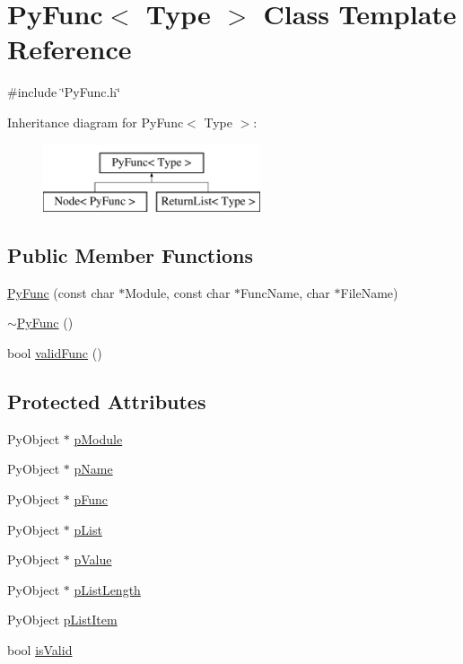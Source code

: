 \hypertarget{classPyFunc}{\section{Py\-Func$<$ Type $>$ Class Template Reference}
\label{classPyFunc}
}


{\ttfamily \#include \char`\"{}Py\-Func.\-h\char`\"{}}

Inheritance diagram for Py\-Func$<$ Type $>$\-:\begin{figure}[H]
\begin{center}
\leavevmode
\includegraphics[height=2.000000cm]{classPyFunc}
\end{center}
\end{figure}
\subsection*{Public Member Functions}
\begin{DoxyCompactItemize}
\item 
\hyperlink{classPyFunc_abdf959abaa390e591d6831631a63b847}{Py\-Func} (const char $\ast$Module, const char $\ast$Func\-Name, char $\ast$File\-Name)
\item 
\hyperlink{classPyFunc_a5813fdcef05c12cb8cc6049386ca4509}{$\sim$\-Py\-Func} ()
\item 
bool \hyperlink{classPyFunc_a9765fda4c500e4225a2d5a766fd4d13b}{valid\-Func} ()
\end{DoxyCompactItemize}
\subsection*{Protected Attributes}
\begin{DoxyCompactItemize}
\item 
Py\-Object $\ast$ \hyperlink{classPyFunc_aa87d68b9046b473e3cfeb4a0e08dccf0}{p\-Module}
\item 
Py\-Object $\ast$ \hyperlink{classPyFunc_aee7f0c1f281e63e0d26ff71b9868c086}{p\-Name}
\item 
Py\-Object $\ast$ \hyperlink{classPyFunc_a941eb18b7d22632c55b41652d79b0481}{p\-Func}
\item 
Py\-Object $\ast$ \hyperlink{classPyFunc_af3d520a4b2580b0ac96ad5ee9f745335}{p\-List}
\item 
Py\-Object $\ast$ \hyperlink{classPyFunc_a3c63064658876c190224c4adc5f5dc07}{p\-Value}
\item 
Py\-Object $\ast$ \hyperlink{classPyFunc_a9794285af7ee57f561e56685b374ff63}{p\-List\-Length}
\item 
Py\-Object \hyperlink{classPyFunc_afcc6a33961a461a500f5ea5b9d280e3e}{p\-List\-Item}
\item 
bool \hyperlink{classPyFunc_a6b9334f10ee479b14189e2bb7d9d4cc3}{is\-Valid}
\end{DoxyCompactItemize}


